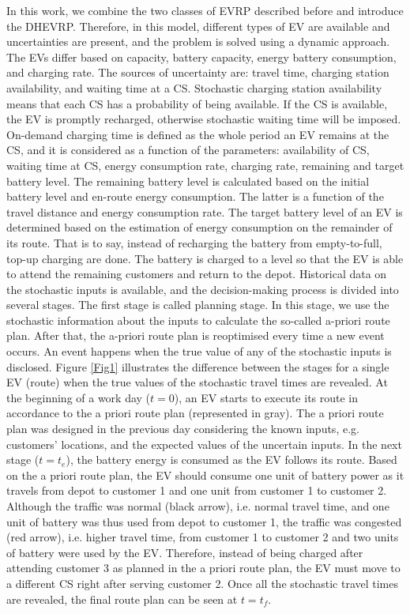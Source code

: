\documentclass[11pt]{article}
\begin{document}
In this work, we combine the two classes of EVRP described before and introduce the DHEVRP. Therefore, in this model, different types of EV are available and uncertainties are present, and the problem is solved using a dynamic approach. The EVs differ based on capacity, battery capacity, energy battery consumption, and charging rate. The sources of uncertainty are: travel time, charging station availability, and waiting time at a CS. Stochastic charging station availability means that each CS has a probability of being available. If the CS is available, the EV is promptly recharged, otherwise stochastic waiting time will be imposed. On-demand charging time is defined as the whole period an EV remains at the CS, and it is considered as a function of the parameters: availability of CS, waiting time at CS, energy consumption rate, charging rate, remaining and target battery level. The remaining battery level is calculated based on the initial battery level and en-route energy consumption. The latter is a function of the travel distance and energy consumption rate. The target battery level of an EV is determined based on the estimation of energy consumption on the remainder of its route. That is to say, instead of recharging the battery from empty-to-full, top-up charging are done. The battery is charged to a level so that the EV is able to attend the remaining customers and return to the depot. Historical data on the stochastic inputs is available, and the decision-making process is divided into several stages. The first stage is called planning stage. In this stage, we use the stochastic information about the inputs to calculate the so-called a-priori route plan. After that, the a-priori route plan is reoptimised every time a new event occurs. An event happens when the true value of any of the stochastic inputs is disclosed. Figure \ref{Fig1} illustrates the difference between the stages for a single EV (route) when the true values of the stochastic travel times are revealed. At the beginning of a work day ($t = 0$), an EV starts to execute its route in accordance to the a priori route plan (represented in gray). The a priori route plan was designed in the previous day considering the known inputs, e.g. customers' locations, and the expected values of the uncertain inputs. In the next stage ($t = t_e$), the battery energy is consumed as the EV follows its route. Based on the a priori route plan, the EV should consume one unit of battery power as it travels from depot to customer 1 and one unit from customer 1 to customer 2. Although the traffic was normal (black arrow), i.e. normal travel time, and one unit of battery was thus used from depot to customer 1, the traffic was congested (red arrow), i.e. higher travel time, from customer 1 to customer 2 and two units of battery were used by the EV. Therefore, instead of being charged after attending customer 3 as planned in the a priori route plan, the EV must move to a different CS right after serving customer 2. Once all the stochastic travel times are revealed, the final route plan can be seen at $t = t_f$.
\end{document}
